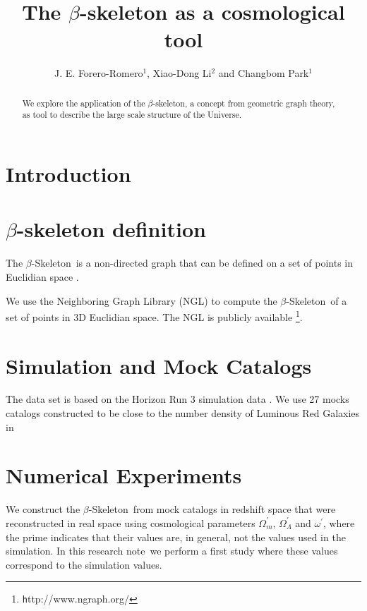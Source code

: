 \documentclass{emulateapj}
\newcommand{\documentname}{research note}
\newcommand{\skel}{$\beta$-Skeleton}
\begin{document}
 

\title{The $\beta$-skeleton as a cosmological tool}
\author{J. E. Forero-Romero$^1$,
  Xiao-Dong Li$^2$  and Changbom Park$^{1}$}
\begin{abstract}
We explore the application of the $\beta$-skeleton, a concept from
geometric graph theory, as tool to describe the large scale structure
of the Universe.
\end{abstract}


\section{Introduction}


\section{$\beta$-skeleton definition}

The \skel\ is a non-directed graph that can be defined on a set of
points in Euclidian space \citep{beta-def}.

We use the Neighboring Graph Library (NGL) \citep{Correa2011}to
compute the \skel\ of a set of points in 3D Euclidian space.  The NGL
is publicly available \footnote{{\texttt http://www.ngraph.org/}}.

\section{Simulation and Mock Catalogs}
\label{sec:simulation}

The data set is based on the Horizon Run 3 simulation data
\citep{HR3}. We use 27 mocks catalogs constructed to be close to the
number density of Luminous Red Galaxies in  


\section{Numerical Experiments}
\label{sec:experiments}

We construct the \skel\ from mock catalogs in redshift space that were
reconstructed in real space using cosmological parameters
$\Omega_m^{\prime}$, $\Omega_\Lambda^\prime$ and $\omega^{\prime}$,
where the prime indicates that their values are, in general, not the
values used in the simulation. In this \documentname\ we perform a
first study where these values correspond to the simulation values.
\end{document}
